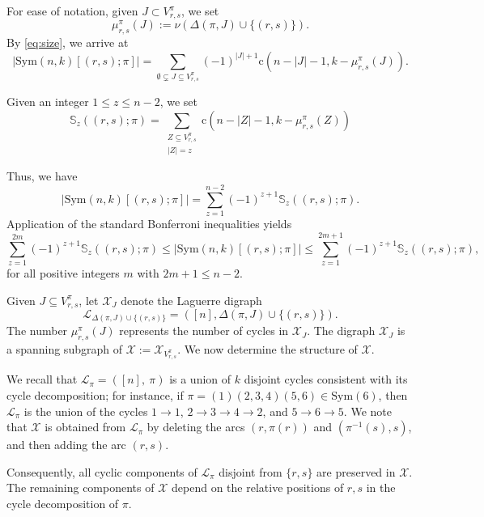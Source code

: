 \documentclass{amsart}
\newcommand{\cy}{\nu}
\newcommand{\bb}{\mathbb}
\newcommand{\mcal}{\mathcal}
\newcommand{\sym}{\mathrm{Sym}}
\newcommand{\st}{\mathrm{c}}
\begin{document}
For ease of notation, given $J\subset V_{r,s}^{\pi}$, we set 
\begin{equation}\label{eq:mu}
\mu_{r,s}^{\pi}(J):=\cy(\Delta(\pi,J)\cup\{(r,s)\}).
\end{equation}
 By \eqref{eq:size}, we arrive at
\begin{equation}\label{eq:PIE} 
|\sym(n,k)[(r,s);\pi]|= \sum\limits_{\emptyset\subsetneq J \subseteq V_{r,s}^{\pi}} (-1)^{|J|+1} \st(n-|J|-1,k-\mu_{r,s}^{\pi}(J)).
\end{equation}

Given an integer $1\leq z \leq n-2 $, we set
\begin{equation}\label{eq:bonfterm}
\bb{S}_{z}((r,s);\pi) = \sum\limits_{\substack{Z \subseteq V_{r,s}^{\pi}\\  |Z|=z }} \st(n-|Z|-1,k-\mu_{r,s}^{\pi}(Z))
\end{equation}

Thus, we have 
\[|\sym(n,k)[(r,s);\pi]|= \sum\limits_{z=1}^{n-2} (-1)^{z+1}\bb{S}_{z}((r,s);\pi).\]
Application of the standard Bonferroni inequalities yields
\begin{equation}\label{eq:bonf}
\sum\limits_{z=1}^{2m} (-1)^{z+1}\bb{S}_{z}((r,s);\pi) \leq |\sym(n,k)[(r,s);\pi]| \leq \sum\limits_{z=1}^{2m+1} (-1)^{z+1}\bb{S}_{z}((r,s);\pi),
\end{equation}
for all positive integers $m$ with $2m+1 \leq n-2$.

Given $J\subseteq V_{r,s}^{\pi}$, let $\mcal{X}_{J}$ denote the Laguerre digraph \[\mcal{L}_{\Delta(\pi,J) \cup \{(r,s)\}}=([n], \Delta(\pi,J) \cup \{(r,s)\}).\] The number $\mu_{r,s}^{\pi}(J)$ represents the number of cycles in $\mcal{X}_{J}$.
The digraph $\mcal{X}_{J}$ is a spanning subgraph of $\mcal{X}:=\mcal{X}_{V_{r,s}^{\pi}}$. We now determine the structure of $\mcal{X}$. 

We recall that $\mcal{L}_{\pi}=([n],\ \pi)$ is a union of $k$ disjoint cycles consistent with its cycle decomposition; for instance, if $\pi=(1)(2,3,4)(5,6)\in \sym(6)$, then $\mcal{L}_{\pi}$ is the union of the cycles $1\to 1$, $2\to3\to4\to2$, and $5\to6\to5$. We note that $\mcal{X}$ is obtained from $\mcal{L}_{\pi}$ by
deleting the arcs $(r,\pi(r))$ and $(\pi^{-1}(s),s)$, and then adding the arc $(r,s)$. 

Consequently, all cyclic components of $\mcal{L}_{\pi}$ disjoint from $\{r,s\}$ are preserved in $\mcal{X}$. The remaining components of $\mcal{X}$ depend on the relative positions of $r,s$ in the cycle decomposition of $\pi$.
\end{document}
